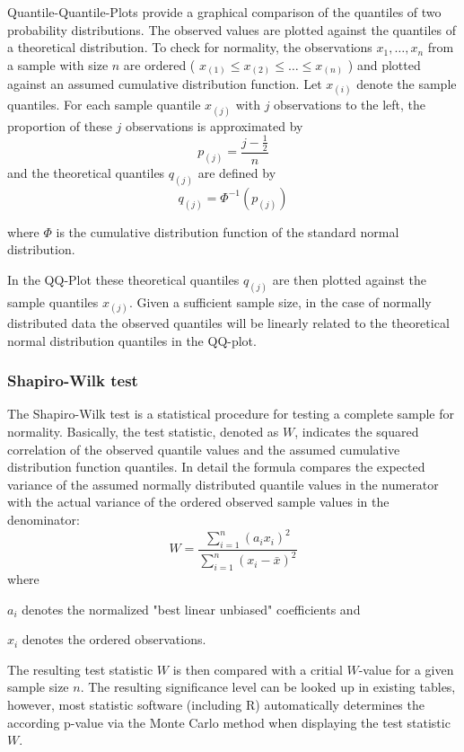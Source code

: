 \documentclass[a4paper, 12pt, titlepage, headsepline, listof = totoc, bibliography = totoc, numbers = noenddot]{scrartcl}
\begin{document}
Quantile-Quantile-Plots provide a graphical comparison of the quantiles of two probability distributions. The observed values are plotted against the quantiles of a theoretical distribution. To check for normality, the observations $x_1, \dots, x_n$ from a sample with size $n$ are ordered ( $x_{(1)} \le x_{(2)} \le \dots \le x_{(n)}$ ) and plotted against an assumed cumulative distribution function. Let $x_{(i)}$ denote the sample quantiles. For each sample quantile $x_{(j)}$ with $j$ observations to the left, the proportion of these $j$ observations is approximated by
\[ p_{(j)} = \frac{j - \frac{1}{2}} {n}\]
and the theoretical quantiles $q_{(j)}$ are defined by
\[ q_{(j)} = \Phi^{-1}(p_{(j)}) \]

where $\Phi$ is the cumulative distribution function of the standard normal distribution.

In the QQ-Plot these theoretical quantiles $q_{(j)}$ are then plotted against the sample quantiles $x_{(j)}$. Given a sufficient sample size, in the case of normally distributed data the observed quantiles will be linearly related to the theoretical normal distribution quantiles in the QQ-plot.

\subsubsection{Shapiro-Wilk test}\label{sec:shapiro-theoretical}

The Shapiro-Wilk test is a statistical procedure for testing a complete sample for normality. Basically, the test statistic, denoted as $W$, indicates the squared correlation of the observed quantile values and the assumed cumulative distribution function quantiles. In detail the formula compares the expected variance of the assumed normally distributed quantile values in the numerator with the actual variance of the ordered observed sample values in the denominator:
\[ W = \frac{\sum \limits_{i=1}^n (a_i x_i)^2} {\sum \limits_{i=1}^n (x_i-\bar{x})^2}\]
where

$a_i$ denotes the normalized "best linear unbiased" coefficients and

$x_i$ denotes the ordered observations.

The resulting test statistic $W$ is then compared with a critial $W$-value for a given sample size $n$. The resulting significance level can be looked up in existing tables, however, most statistic software (including R) automatically determines the according p-value via the Monte Carlo method when displaying the test statistic $W$.
\end{document}
